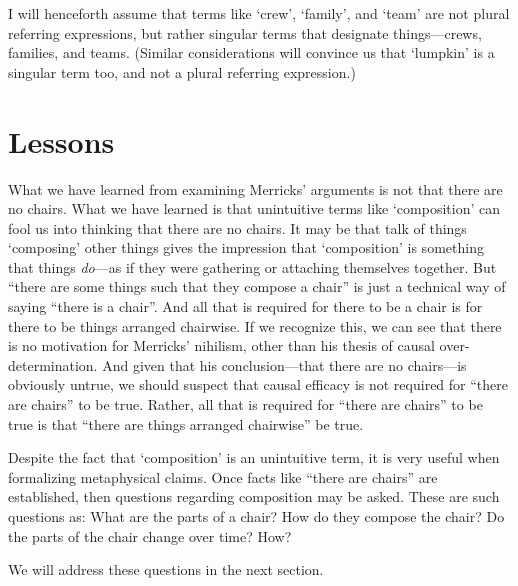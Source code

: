 \documentclass[11pt]{article}
\begin{document}
\begin{spacing}{1.25}
I will henceforth assume that terms like `crew', `family', and `team'
are not plural referring expressions, but rather singular terms that
designate things---crews, families, and teams.  (Similar
considerations will convince us that `lumpkin' is a singular term too,
and not a plural referring expression.)

\section{Lessons}
\label{lessons-m}
What we have learned from examining Merricks' arguments is not that
there are no chairs.  What we have learned is that unintuitive terms
like `composition' can fool us into thinking that there are no chairs.
It may be that talk of things `composing' other things gives the
impression that `composition' is something that things {\em do}---as
if they were gathering or attaching themselves together.  But ``there
are some things such that they compose a chair'' is just a technical
way of saying ``there is a chair''.  And all that is required for
there to be a chair is for there to be things arranged chairwise.  If
we recognize this, we can see that there is no motivation for
Merricks' nihilism, other than his thesis of causal
over-determination.  And given that his conclusion---that there are no
chairs---is obviously untrue, we should suspect that causal efficacy
is not required for ``there are chairs'' to be true.  Rather, all that
is required for ``there are chairs'' to be true is that ``there are
things arranged chairwise'' be true.

Despite the fact that `composition' is an unintuitive term, it is very
useful when formalizing metaphysical claims.  Once facts like ``there
are chairs'' are established, then questions regarding composition may
be asked.  These are such questions as: What are the parts of a chair?
How do they compose the chair?  Do the parts of the chair change over
time?  How?

We will address these questions in the next section.
\ifstandalone
\end{spacing}


\fi
\end{document}
